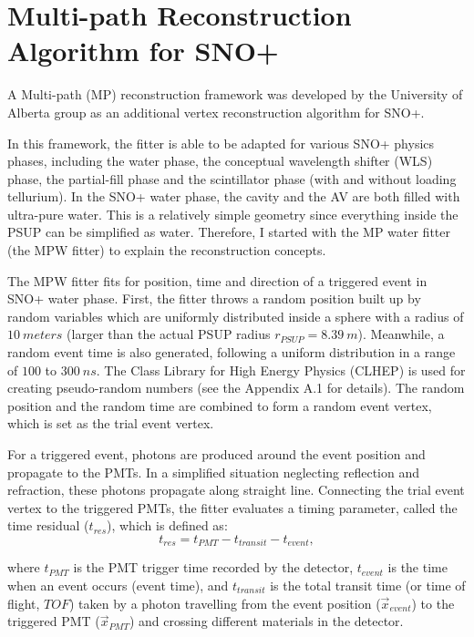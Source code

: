 \section{Multi-path Reconstruction Algorithm for SNO+}\label{sect:mpw}
A Multi-path (MP) reconstruction framework was developed by the University of Alberta group as an additional vertex reconstruction algorithm for SNO+.

In this framework, the fitter is able to be adapted for various SNO+ physics phases, including the water phase, the conceptual wavelength shifter (WLS) phase, the partial-fill phase and the scintillator phase (with and without loading tellurium). In the SNO+ water phase, the cavity and the AV are both filled with ultra-pure water. This is a relatively simple geometry since everything inside the PSUP can be simplified as water. Therefore, I started with the MP water fitter (the MPW fitter) to explain the reconstruction concepts.

The MPW fitter fits for position, time and direction of a triggered event in SNO+ water phase. First, the fitter throws a random position built up by random variables which are uniformly distributed inside a sphere with a radius of $10~meters$ (larger than the actual PSUP radius $r_{PSUP}=8.39~m$). Meanwhile, a random event time is also generated, following a uniform distribution in a range of $100$ to $300~ns$. The Class Library for High Energy Physics (CLHEP) is used for creating pseudo-random numbers (see the Appendix A.1 for details). The random position and the random time are combined to form a random event vertex, which is set as the trial event vertex.

For a triggered event, photons are produced around the event position and propagate to the PMTs.
In a simplified situation neglecting reflection and refraction, these photons propagate along straight line. Connecting the trial event vertex to the triggered PMTs, the fitter evaluates a timing parameter, called the time residual ($t_{res}$), which is defined as:
\begin{equation}
\label{tres_define}
t_{res}=t_{PMT} - t_{transit} - t_{event},
\end{equation}

where $t_{PMT}$ is the PMT trigger time recorded by the detector, $t_{event}$ is the time when an event occurs (event time), and $t_{transit}$ is the total transit time (or time of flight, $TOF$) taken by a photon travelling from the event position ($\vec{x}_{event}$) to the triggered PMT ($\vec{x}_{PMT}$) and crossing different materials in the detector.

